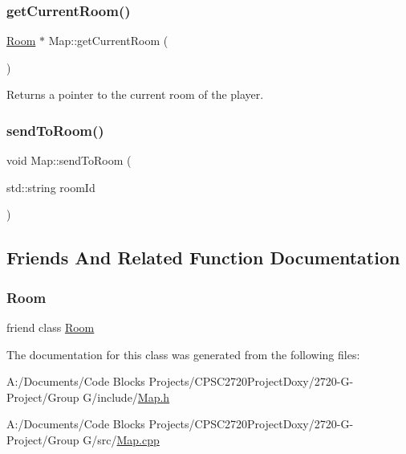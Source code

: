 \subsubsection{\texorpdfstring{get\+Current\+Room()}{getCurrentRoom()}}
{\footnotesize\ttfamily \mbox{\hyperlink{class_room}{Room}} $\ast$ Map\+::get\+Current\+Room (\begin{DoxyParamCaption}{ }\end{DoxyParamCaption})}



Returns a pointer to the current room of the player. 

\mbox{\label{class_map_a0c82625bc062af1b5e058978350811f0}} 
\subsubsection{\texorpdfstring{send\+To\+Room()}{sendToRoom()}}
{\footnotesize\ttfamily void Map\+::send\+To\+Room (\begin{DoxyParamCaption}\item[{std\+::string}]{room\+Id }\end{DoxyParamCaption})}



\subsection{Friends And Related Function Documentation}
\mbox{\label{class_map_ad579dfb5bd3be0d05d8775896307d9b3}} 
\subsubsection{\texorpdfstring{Room}{Room}}
{\footnotesize\ttfamily friend class \mbox{\hyperlink{class_room}{Room}}\hspace{0.3cm}{\ttfamily [friend]}}



The documentation for this class was generated from the following files\+:\begin{DoxyCompactItemize}
\item 
A\+:/\+Documents/\+Code Blocks Projects/\+C\+P\+S\+C2720\+Project\+Doxy/2720-\/\+G-\/\+Project/\+Group G/include/\mbox{\hyperlink{_map_8h}{Map.\+h}}\item 
A\+:/\+Documents/\+Code Blocks Projects/\+C\+P\+S\+C2720\+Project\+Doxy/2720-\/\+G-\/\+Project/\+Group G/src/\mbox{\hyperlink{_map_8cpp}{Map.\+cpp}}\end{DoxyCompactItemize}
